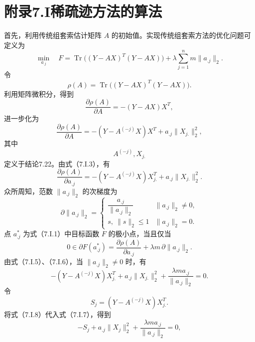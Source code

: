 \section*{附录7.I\quad 稀疏迹方法的算法}

首先，利用传统组套索估计矩阵 $A$ 的初始值。实现传统组套索方法的优化问题可定义为
\begin{equation}
\min_{a_{.j}}\quad F=\operatorname{Tr}\bigl((Y-AX)^T(Y-AX)\bigr)
 +\lambda\sum_{j=1}^nm\|a_{.j}\|_2.\tag{7.I.1}
\end{equation}
令
\[
\rho(A)=\operatorname{Tr}\bigl((Y-AX)^T(Y-AX)\bigr).
\]
利用矩阵微积分，得到
\begin{equation}
\frac{\partial\rho(A)}{\partial A}=-(Y-AX)X^T,\tag{7.I.2}
\end{equation}
进一步化为
\begin{equation}
\frac{\partial\rho(A)}{\partial A}
 =-(Y-A^{(-j)}X)X^T+a_{.j}\|X_{j.}\|_2^2,\tag{7.I.3}
\end{equation}
其中
\[
A^{(-j)},X_{j.}
\]
定义于结论7.22。由式（7.I.3），有
\begin{equation}
\frac{\partial\rho(A)}{\partial a_{.j}}
 =-(Y-A^{(-j)}X)X_{j.}^T+a_{.j}\|X_{j.}\|_2^2.\tag{7.I.4}
\end{equation}
众所周知，范数 $\|a_{.j}\|_2$ 的次梯度为
\begin{equation}
\partial\|a_{.j}\|_2=\begin{cases}
\dfrac{a_{.j}}{\|a_{.j}\|_2}&\|a_{.j}\|_2\ne0,\\
s,\ \|s\|_2\le1&\|a_{.j}\|_2=0.
\end{cases}\tag{7.I.5}
\end{equation}
点 $a_{.j}^*$ 为式（7.I.1）中目标函数 $F$ 的极小点，当且仅当
\begin{equation}
0\in\partial F(a_{.j}^*)=\frac{\partial\rho(A)}{\partial a_{.j}}
 +\lambda m\,\partial\|a_{.j}\|_2.\tag{7.I.6}
\end{equation}
由式（7.I.5）、（7.I.6），当 $\|a_{.j}\|_2\ne0$ 时，有
\begin{equation}
-(Y-A^{(-j)}X)X_{j.}^T+a_{.j}\|X_{j.}\|_2^2
 +\frac{\lambda ma_{.j}}{\|a_{.j}\|_2}=0.\tag{7.I.7}
\end{equation}
令
\begin{equation}
S_j=(Y-A^{(-j)}X)X_{j.}^T.\tag{7.I.8}
\end{equation}
将式（7.I.8）代入式（7.I.7），得到
\begin{equation}
-S_j+a_{.j}\|X_j\|_2^2+\frac{\lambda ma_{.j}}{\|a_{.j}\|_2}=0,\tag{7.I.9}
\end{equation}
